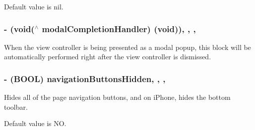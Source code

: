 Default value is nil. \hypertarget{interface_t_o_web_view_controller_a56610537e590382f92d90fd797239d0b}{}
\subsubsection[{modal\+Completion\+Handler}]{\setlength{\rightskip}{0pt plus 5cm}-\/ (void($^\wedge$ modal\+Completion\+Handler) (void))\hspace{0.3cm}{\ttfamily [read]}, {\ttfamily [write]}, {\ttfamily [nonatomic]}, {\ttfamily [copy]}}\label{interface_t_o_web_view_controller_a56610537e590382f92d90fd797239d0b}
When the view controller is being presented as a modal popup, this block will be automatically performed right after the view controller is dismissed. \hypertarget{interface_t_o_web_view_controller_af512e482ad9d8f9334413c7d80f06247}{}
\subsubsection[{navigation\+Buttons\+Hidden}]{\setlength{\rightskip}{0pt plus 5cm}-\/ (B\+O\+O\+L) navigation\+Buttons\+Hidden\hspace{0.3cm}{\ttfamily [read]}, {\ttfamily [write]}, {\ttfamily [nonatomic]}, {\ttfamily [assign]}}\label{interface_t_o_web_view_controller_af512e482ad9d8f9334413c7d80f06247}
Hides all of the page navigation buttons, and on i\+Phone, hides the bottom toolbar.

Default value is N\+O. \hypertarget{interface_t_o_web_view_controller_a030a5b87b4ba4fb31e7bdbe10656f62a}{}
